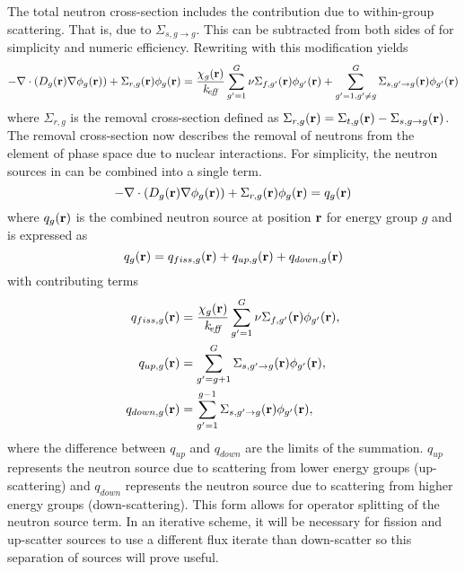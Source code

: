  The total neutron cross-section includes the contribution due to 
  within-group scattering. That is, due to $\Sigma_{s,g\rightarrow g}$. This can
  be subtracted from both sides of  for simplicity 
  and numeric efficiency. Rewriting  with this
  modification yields
  \begin{equation} 
    \label{eq:multigroup_removal}
    - \mathbf{\nabla} \cdot( D_g(\mathbf{r}) \mathbf{\nabla} \phi_g(\mathbf{r})) + \Sigma_{r,g}(\mathbf{r}) \phi_g(\mathbf{r}) = 
      \frac{\chi_g(\mathbf{r})}{k_{\!\mbox{\scriptsize \em eff}}} \sum_{g'=1}^{G} \nu\Sigma_{f,g'}(\mathbf{r}) 
      \phi_{g'}(\mathbf{r}) + \sum_{g'=1, g' \ne g}^{G} 
      \Sigma_{s,g' \rightarrow g}(\mathbf{r}) \phi_{g'}(\mathbf{r})
  \end{equation}
  where $\Sigma_{r,g}$ is the removal cross-section defined as 
  $\Sigma_{r,g}(\mathbf{r}) = \Sigma_{t,g}(\mathbf{r}) - \Sigma_{s,g\rightarrow g}(\mathbf{r})$. The
  removal cross-section now describes the removal of neutrons from the element
  of phase space due to nuclear interactions. 
  For simplicity, the neutron sources in  can be 
  combined into a single term.
  \begin{equation} \label{eq:multigroup_source}
    - \mathbf{\nabla} \cdot( D_g(\mathbf{r}) \mathbf{\nabla} \phi_g(\mathbf{r})) + \Sigma_{r,g}(\mathbf{r}) \phi_g(\mathbf{r}) = 
      q_g(\mathbf{r})
  \end{equation}
  where $q_g(\mathbf{r})$ is the combined neutron source at position $\mathbf{r}$ for energy
  group $g$ and is expressed as
  \begin{equation}
    \label{eq:q}
    q_g(\mathbf{r}) = q_{fiss,g}(\mathbf{r}) + q_{up,g}(\mathbf{r}) + q_{down,g}(\mathbf{r}) \\
  \end{equation}
  with contributing terms
  \begin{align}
    \label{eq:qfiss}
    q_{fiss,g}(\mathbf{r}) &= \frac{\chi_g(\mathbf{r})}{k_{\!\mbox{\scriptsize \em eff}}} \sum_{g'=1}^{G} 
      \nu \Sigma_{f,g'}(\mathbf{r}) \phi_{g'}(\mathbf{r}), \\
    \label{eq:qup}
    q_{up,g}(\mathbf{r}) &= \sum_{g'=g+1}^{G} \Sigma_{s,g' \rightarrow g}(\mathbf{r})
      \phi_{g'}(\mathbf{r}), \\
    \label{eq:qdown}
    q_{down,g}(\mathbf{r}) &= \sum_{g'=1}^{g-1} \Sigma_{s,g' \rightarrow g}(\mathbf{r})
      \phi_{g'}(\mathbf{r}),
  \end{align}
  where the difference between $q_{up}$ and $q_{down}$ are the limits of the 
  summation. $q_{up}$ represents the neutron source due to scattering from lower
  energy groups (up-scattering) and $q_{down}$ represents the neutron source due
  to scattering from higher energy groups (down-scattering). This form allows
  for operator splitting of the neutron source term.
  In an iterative scheme, it will be necessary for fission and up-scatter 
  sources to use a different flux iterate than down-scatter so this separation
  of sources will prove useful.

